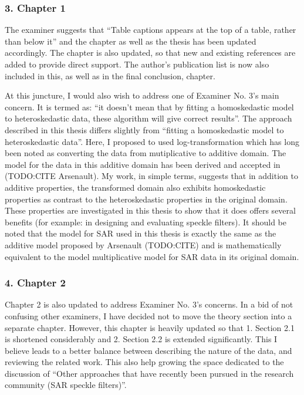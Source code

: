 \subsubsection*{3. Chapter 1}

The examiner suggests that ``Table captions appears at the top of a table, rather than below it'' and the chapter as well as the thesis has been updated accordingly.
The chapter is also updated, so that new and existing references are added to provide direct support.
The author's publication list is now also included in this, as well as in the final conclusion, chapter.

At this juncture, I would also wish to address one of Examiner No. 3's main concern.
It is termed as: ``it doesn't mean that by fitting a homoskedastic model to heteroskedastic data, these algorithm will give correct results''.
The approach described in this thesis differs slightly from ``fitting a homoskedastic model to heteroskedastic data''.
Here, I proposed to used log-transformation which has long been noted as converting the data from mutiplicative to additive domain.
The model for the data in this additive domain has been derived and accepted in (TODO:CITE Arsenault).
My work, in simple terms, suggests that in addition to additive properties, the transformed domain also exhibits homoskedastic properties as contrast to the heteroskedastic properties in the original domain.
These properties are investigated in this thesis to show that it does offers several benefits (for example: in designing and evaluating speckle filters).
It should be noted that the model for SAR used in this thesis is exactly the same as the additive model proposed by Arsenault (TODO:CITE) and is mathematically equivalent to the model multiplicative model for SAR data in its original domain.

\subsubsection*{4. Chapter 2}

Chapter 2 is also updated to address Examiner No. 3's concerns.
In a bid of not confusing other examiners, I have decided not to move the theory section into a separate chapter.
However, this chapter is heavily updated so that 1. Section 2.1 is shortened considerably and 2. Section 2.2 is extended significantly. 
This I believe leads to a better balance between describing the nature of the data, and reviewing the related work.
This also help growing the space dedicated to the discussion of ``Other approaches that have recently been pursued in the research community (SAR speckle filters)''.

